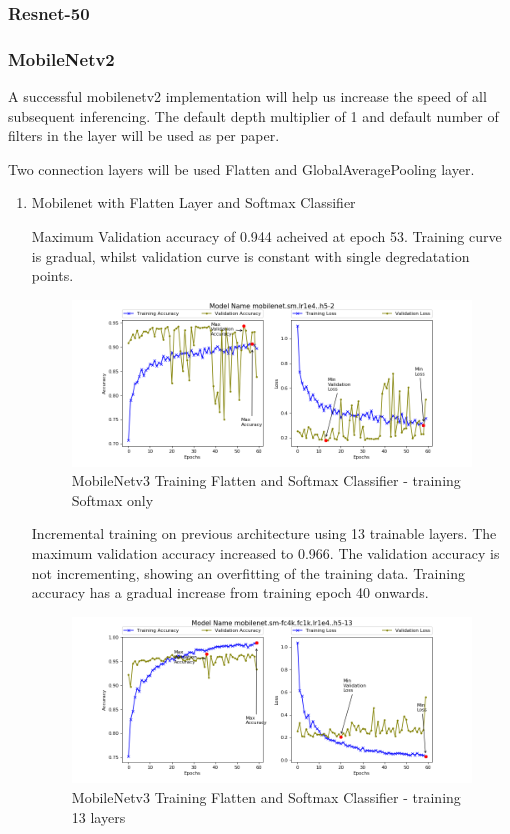 \documentclass{article}
\begin{document}
\subsubsection{Resnet-50}



\subsubsection{MobileNetv2}

A successful mobilenetv2 implementation will help us increase the speed of all subsequent inferencing. The default depth multiplier of 1 and default number of filters in the layer will be used as per paper. 

Two connection layers will be used Flatten and GlobalAveragePooling layer.

\begin{enumerate}
\item Mobilenet with Flatten Layer and Softmax Classifier 

Maximum Validation accuracy of 0.944 acheived at epoch 53. Training curve is gradual, whilst validation curve is constant with single degredatation points.

\begin{figure}[H]
\centering
\label{fig:mob3-1}
\includegraphics[scale=0.6]{images/mob3-1.png}
\caption{MobileNetv3 Training Flatten and Softmax Classifier - training Softmax only}
\end{figure}

Incremental training on previous architecture using 13 trainable layers. The maximum validation accuracy increased to 0.966. The validation accuracy is not incrementing, showing an overfitting of the training data. Training accuracy has a gradual increase from training epoch 40 onwards.

\begin{figure}[H]
\centering
\label{fig:mob3-2}
\includegraphics[scale=0.6]{images/mob3-2.png}
\caption{MobileNetv3 Training Flatten and Softmax Classifier - training 13 layers}
\end{figure}


\end{enumerate}
\end{document}
